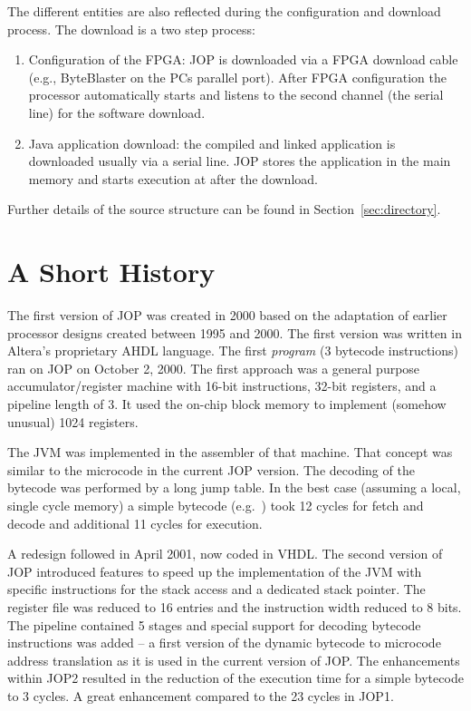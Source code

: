 The different entities are also reflected during the configuration
and download process. The download is a two step process:
\begin{enumerate}
    \item Configuration of the FPGA: JOP is downloaded via a FPGA
        download cable (e.g., ByteBlaster on the PCs parallel
        port). After FPGA configuration the processor
        automatically starts and listens to the second channel
        (the serial line) for the software download.
    \item Java application download: the compiled and linked
    application is downloaded usually via a serial line. JOP stores
    the application in the main memory and starts execution at
     after the download.
\end{enumerate}

Further details of the source structure can be found in
Section~\ref{sec:directory}.

\section{A Short History}

The first version of JOP was created in 2000 based on the adaptation
of earlier processor designs created between 1995 and 2000. The first
version was written in Altera's proprietary AHDL language. The first
\emph{program} (3 bytecode instructions) ran on JOP on October 2,
2000. The first approach was a general purpose accumulator/register
machine with 16-bit instructions, 32-bit registers, and a pipeline
length of 3. It used the on-chip block memory to implement (somehow
unusual) 1024 registers.

The JVM was implemented in the assembler of that machine. That
concept was similar to the microcode in the current JOP version. The
decoding of the bytecode was performed by a long jump table. In the
best case (assuming a local, single cycle memory) a simple bytecode
(e.g.\ ) took 12 cycles for fetch and decode and
additional 11 cycles for execution.


A redesign followed in April 2001, now coded in VHDL. The second
version of JOP introduced features to speed up the implementation of
the JVM with specific instructions for the stack access and a
dedicated stack pointer. The register file was reduced to 16 entries
and the instruction width reduced to 8 bits. The pipeline contained 5
stages and special support for decoding bytecode instructions was
added -- a first version of the dynamic bytecode to microcode address
translation as it is used in the current version of JOP. The
enhancements within JOP2 resulted in the reduction of the execution
time for a simple bytecode to 3 cycles. A great enhancement compared
to the 23 cycles in JOP1.

